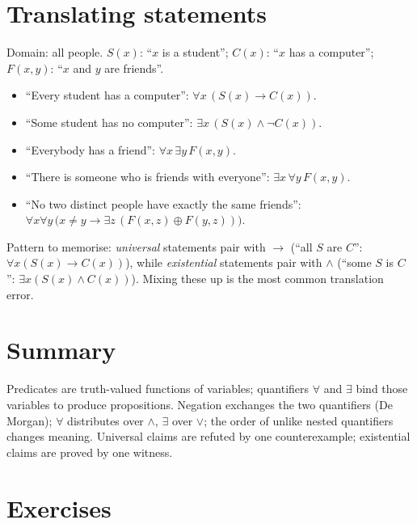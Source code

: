 \section{Translating statements}

\begin{example}
Domain: all people. $S(x)$: ``$x$ is a student''; $C(x)$: ``$x$ has a
computer''; $F(x,y)$: ``$x$ and $y$ are friends''.
\begin{itemize}
\item ``Every student has a computer'':
  $\forall x\,(S(x) \to C(x))$.
\item ``Some student has no computer'':
  $\exists x\,(S(x) \wedge \neg C(x))$.
\item ``Everybody has a friend'': $\forall x\, \exists y\, F(x,y)$.
\item ``There is someone who is friends with everyone'':
  $\exists x\, \forall y\, F(x,y)$.
\item ``No two distinct people have exactly the same friends'':
  $\forall x \forall y\,\bigl(x \neq y \to \exists z\,(F(x,z) \oplus
  F(y,z))\bigr)$.
\end{itemize}
\end{example}

\begin{notebox}
Pattern to memorise: \emph{universal} statements pair with $\to$
(``all $S$ are $C$'': $\forall x (S(x) \to C(x))$), while \emph{existential}
statements pair with $\wedge$ (``some $S$ is $C$'':
$\exists x (S(x) \wedge C(x))$). Mixing these up is the most common
translation error.
\end{notebox}

\section{Summary}

Predicates are truth-valued functions of variables; quantifiers $\forall$ and
$\exists$ bind those variables to produce propositions. Negation exchanges the
two quantifiers (De Morgan); $\forall$ distributes over $\wedge$, $\exists$
over $\vee$; the order of unlike nested quantifiers changes meaning. Universal
claims are refuted by one counterexample; existential claims are proved by one
witness.

\section*{Exercises}

